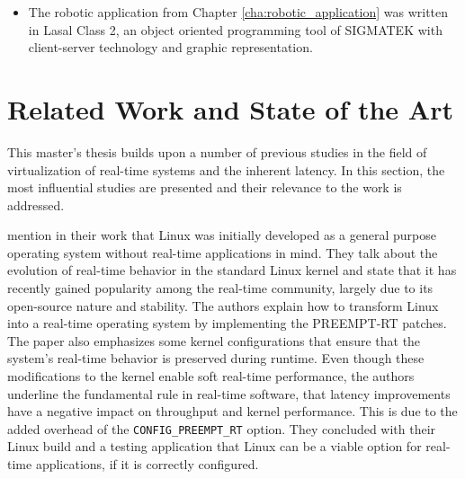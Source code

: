 \documentclass[MMR,Master,english]{twbook}
\begin{document}
\begin{itemize}
	\item The robotic application from Chapter \ref{cha:robotic_application} was written in Lasal Class 2, an object oriented programming tool of SIGMATEK with client-server technology and graphic representation. 
	\end{itemize}

\section{Related Work and State of the Art}

This master’s thesis builds upon a number of previous studies in the field of virtualization of real-time systems and the inherent latency. In this section, the most influential studies are presented and their relevance to the work is addressed.

\bigskip \noindent \citeauthor{perneelRealtimeCapabilitiesStandard2015} \cite{perneelRealtimeCapabilitiesStandard2015} mention in their work that Linux was initially developed as a general purpose operating system without real-time applications in mind. 
They talk about the evolution of real-time behavior in the standard Linux kernel and state that it has recently gained popularity among the real-time community, largely due to its open-source nature and stability. The authors explain how to transform Linux into a real-time operating system by implementing the PREEMPT-RT patches. The paper also emphasizes some kernel configurations that ensure that the system's real-time behavior is preserved during runtime. Even though these modifications to the kernel enable soft real-time performance, the authors underline the fundamental rule in real-time software, that latency improvements have a negative impact on throughput and kernel performance. This is due to the added overhead of the \texttt{CONFIG\_PREEMPT\_RT} option. They concluded with their Linux build and a testing application that Linux can be a viable option for real-time applications, if it is correctly configured.
\end{document}
